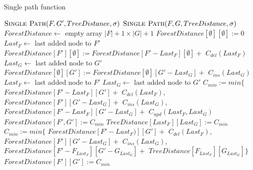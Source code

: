 \begin{algorithm}
  \caption{Single path function}
  \label{alg:spf}
  \begin{algorithmic}[1]
          \State $\Call{Single Path}{F, G', TreeDistance, \sigma}$
        \EndFor
      \Else
          \State $\Call{Single Path}{F, G, TreeDistance, \sigma}$
        \EndFor
      \EndIf
    \EndProcedure
    \\
      \State $ForestDistance \gets$ empty array $|F| + 1 \times |G| + 1$
      \label{alg:spf:init}
      \State $ForestDistance[\emptyset][\emptyset] := 0$
        \State $Last_{F} \gets$ last added node to $F'$
        \State $ForestDistance[F'][\emptyset] := ForestDistance[F' - Last_{F}][\emptyset] +$
        \Indent
          \State $C_{del}(Last_{F})$
        \EndIndent
      \EndFor
        \State $Last_{G} \gets$ last added node to $G'$
        \State $ForestDistance[\emptyset][G'] := ForestDistance[\emptyset][G' - Last_{G}] +$
        \Indent
          \State $C_{ins}(Last_{G})$
        \EndIndent
      \EndFor
          \State $Last_{F} \gets$ last added node to $F'$
          \State $Last_{G} \gets$ last added node to $G'$
          \label{alg:spf:iftrees}
            \State $C_{min} := min \{$
            \Indent
            \State $ForestDistance[F' - Last_{F}][G'] +$
              \Indent
                \State $C_{del}(Last_{F})$,
              \EndIndent
              \State $ForestDistance[F'][G' - Last_{G}] +$
              \Indent
                \State $C_{ins}(Last_{G})$,
              \EndIndent
              \State $ForestDistance[F' - Last_{F}][G' - Last_{G}] +$
              \Indent
                \State $C_{upd}(Last_{F}, Last_{G})$
              \EndIndent
            \EndIndent
            \State $ForestDistance[F', G'] := C_{min}$
            \State $TreeDistance[Last_{F}][Last_{G}] := C_{min}$
          \Else
          \label{alg:spf:ifforests}
            \State $C_{min} := min \{$
            \Indent
              \State $ForestDistance[F' - Last_{F})][G'] +$
              \Indent
                \State $C_{del}(Last_{F})$,
              \EndIndent
              \State $ForestDistance[F'][G' - Last_{G}] +$
              \Indent
                \State $C_{ins}(Last_{G})$,
              \EndIndent
              \State $ForestDistance[F' - F_{Last_{F}}][G' - G_{Last_{G}}] +$
              \Indent
                \State $TreeDistance[F_{Last_{F}}][G_{Last_{G}}]\}$
              \EndIndent
            \EndIndent
            \State $ForestDistance[F'][G'] := C_{min}$
          \EndIf
        \EndFor
      \EndFor
    \EndProcedure
  \end{algorithmic}
\end{algorithm}


